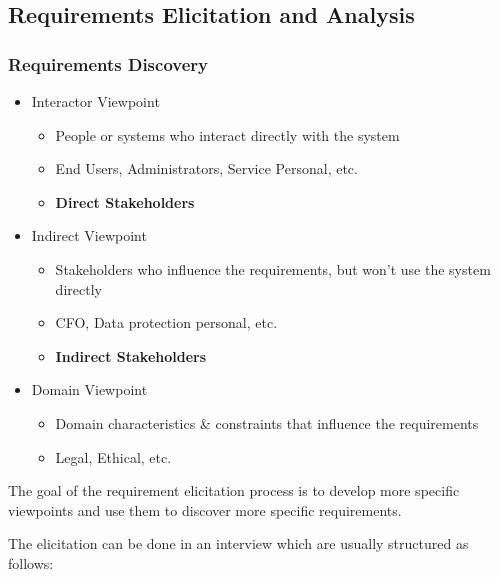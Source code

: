 \documentclass[
../../Software_Engineering_Summary.tex,
]
{subfiles}
\begin{document}
\subsection{Requirements Elicitation and Analysis}
\subsubsection{Requirements Discovery}
\begin{greenbox}
    \begin{itemize}
        \item Interactor Viewpoint
        \begin{itemize}
            \item People or systems who interact directly with the system
            \item End Users, Administrators, Service Personal, etc.
            \item \textbf{Direct Stakeholders}
        \end{itemize}
        \item Indirect Viewpoint
        \begin{itemize}
            \item Stakeholders who influence the requirements, but won't use the system directly
            \item CFO, Data protection personal, etc.
            \item \textbf{Indirect Stakeholders}
        \end{itemize}
        \item Domain Viewpoint
        \begin{itemize}
            \item Domain characteristics \& constraints that influence the requirements
            \item Legal, Ethical, etc.
        \end{itemize}
    \end{itemize}
\end{greenbox}

The goal of the requirement elicitation process is to develop more specific viewpoints and use them to discover more specific requirements.

The elicitation can be done in an interview which are usually structured as follows:
\end{document}
